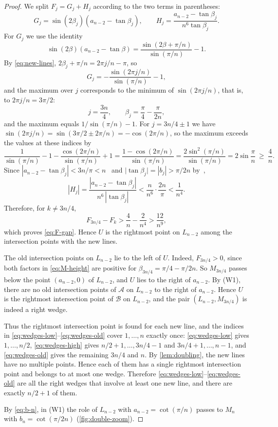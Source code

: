 \begin{proof}
We split $F_j=G_j+H_j$ according to the two terms in parentheses:
\[
G_j=\sin(2\beta_j)\left(a_{n-2}-\tan\beta_j\right),
\qquad
H_j=\frac{a_{n-2}-\tan\beta_j}{n^{6}\tan\beta_j}.
\]
For $G_j$ we use the identity
\begin{equation}\label{eq:tan-id}
\sin(2\beta)(a_{n-2}-\tan\beta)
=\frac{\sin(2\beta+\pi/n)}{\sin(\pi/n)}-1 .
\end{equation}
By \eqref{eq:new-lines}, $2\beta_j+\pi/n=2\pi j/n-\pi$, so
\begin{equation}\label{eq:G-j}
G_j=-\frac{\sin(2\pi j/n)}{\sin(\pi/n)}-1 ,
\end{equation}
and the maximum over $j$ corresponds to the minimum of $\sin(2\pi j/n)$, that is, to $2\pi j/n=3\pi/2$:
\[
j=\frac{3n}{4},
\qquad
\beta_j=\frac\pi4-\frac\pi{2n},
\]
and the maximum equals $1/\sin(\pi/n)-1$.
For $j=3n/4\pm1$ we have $\sin(2\pi j/n)=\sin(3\pi/2\pm2\pi/n)=-\cos(2\pi/n)$, so
the maximum exceeds the values at these indices by
\[
\frac1{\sin(\pi/n)}-1-\frac{\cos(2\pi/n)}{\sin(\pi/n)}+1=
\frac{1-\cos(2\pi/n)}{\sin(\pi/n)}
=\frac{2\sin^2(\pi/n)}{\sin(\pi/n)}
=2\sin\frac\pi n\ \ge\ \frac4n .
\]
Since $|a_{n-2}-\tan\beta_j|<3n/\pi<n$~\cite[Prop.~3.1, item~2]{bbl} and
$\lvert\tan\beta_j\rvert=|b_j|>\pi/2n$ by~\cite[(3)]{bbl},
\[
|H_j|=\frac{|a_{n-2}-\tan\beta_j|}{n^6\,|\tan\beta_j|}<\frac n{n^6}\cdot\frac{2n}\pi<\frac1{n^4}.
\]
Therefore, for $k\ne3n/4$,
\[
F_{3n/4}-F_k>\frac4n-\frac2{n^4}>\frac{12}{n^9},
\]
which proves \eqref{eq:F-gap}. Hence $U$ is the rightmost point on $L_{n-2}$ among the intersection points with the new lines.

The old intersection points on $L_{n-2}$ lie to the left of $U$.
Indeed, $F_{3n/4}>0$, since both factors in \eqref{eq:M-height} are positive for $\beta_{3n/4}=\pi/4-\pi/2n$. So $M_{3n/4}$ passes below the point $(a_{n-2},0)$ of $L_{n-2}$, and $U$ lies to the right of $a_{n-2}$. By (W1), there are no old intersection points of $\mathcal A$ on $L_{n-2}$ to the right of $a_{n-2}$.
Hence $U$ is the rightmost intersection point of $\mathcal B$ on $L_{n-2}$, and the pair $(L_{n-2},M_{3n/4})$ is indeed a right wedge.

Thus the rightmost intersection point is found for each new line, and the indices in \eqref{eq:wedges-low}--\eqref{eq:wedges-old} cover $1,\ldots,n$ exactly once: \eqref{eq:wedges-low} gives $1,\ldots,n/2$, \eqref{eq:wedges-high} gives $n/2+1,\ldots,3n/4-1$ and $3n/4+1,\ldots,n-1$, and \eqref{eq:wedges-old} gives the remaining $3n/4$ and $n$.
By \cref{lem:doubling}, the new lines have no multiple points. Hence each of them has a single rightmost intersection point and belongs to at most one wedge.
Therefore \eqref{eq:wedges-low}--\eqref{eq:wedges-old} are all the right wedges that involve at least one new line, and there are exactly $n/2+1$ of them.

By \eqref{eq:b-n}, in \textup{(W1)} the role of $L_{n-2}$ with $a_{n-2}=\cot(\pi/n)$ passes to $M_n$ with $b_n=\cot(\pi/2n)$ (\cref{fig:double-zoom}).
\end{proof}

